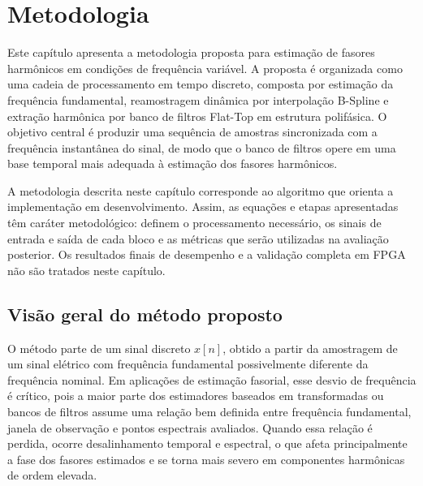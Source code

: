 \chapter{Metodologia}\label{cap:tres}

Este capítulo apresenta a metodologia proposta para estimação de fasores harmônicos em condições de frequência variável. A proposta é organizada como uma cadeia de processamento em tempo discreto, composta por estimação da frequência fundamental, reamostragem dinâmica por interpolação B-Spline e extração harmônica por banco de filtros Flat-Top em estrutura polifásica. O objetivo central é produzir uma sequência de amostras sincronizada com a frequência instantânea do sinal, de modo que o banco de filtros opere em uma base temporal mais adequada à estimação dos fasores harmônicos.

A metodologia descrita neste capítulo corresponde ao algoritmo que orienta a implementação em desenvolvimento. Assim, as equações e etapas apresentadas têm caráter metodológico: definem o processamento necessário, os sinais de entrada e saída de cada bloco e as métricas que serão utilizadas na avaliação posterior. Os resultados finais de desempenho e a validação completa em FPGA não são tratados neste capítulo.


\section{Visão geral do método proposto}

O método parte de um sinal discreto $x[n]$, obtido a partir da amostragem de um sinal elétrico com frequência fundamental possivelmente diferente da frequência nominal. Em aplicações de estimação fasorial, esse desvio de frequência é crítico, pois a maior parte dos estimadores baseados em transformadas ou bancos de filtros assume uma relação bem definida entre frequência fundamental, janela de observação e pontos espectrais avaliados. Quando essa relação é perdida, ocorre desalinhamento temporal e espectral, o que afeta principalmente a fase dos fasores estimados e se torna mais severo em componentes harmônicas de ordem elevada.


